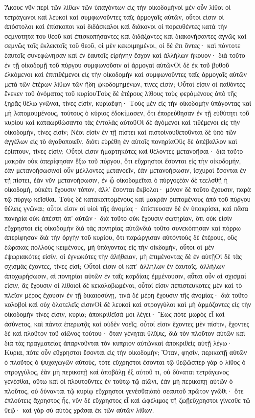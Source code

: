 Ἄκουε νῦν περὶ τῶν λίθων τῶν ὑπαγόντων εἰς τὴν οἰκοδομήνοἱ μὲν οὖν λίθοι οἱ τετράγωνοι καὶ λευκοὶ καὶ συμφωνοῦντες ταῖς ἁρμογαῖς αὐτῶν, οὗτοι εἰσιν οἱ ἀπόστολοι καὶ ἐπίσκοποι καὶ διδάσκαλοι καὶ διάκονοι οἱ πορευθέντες κατὰ τὴν σεμνοτητα του θεοῦ καὶ ἐπισκοπήσαντες καὶ διδάξαντες καὶ διακονήσαντες ἁγνῶς καὶ σεμνῶς τοῖς ἐκλεκτοῖς τοῦ θεοῦ, οἱ μὲν κεκοιμημένοι, οἱ δὲ ἔτι ὄντες· καὶ πάντοτε ἑαυτοῖς συνεφώνησαν καὶ ἐν ἑαυτοῖς εἰρήνην ἔσχον καὶ ἀλλήλων ἤκουον· διὰ τοῦτο ἐν τῇ οἰκοδομῇ τοῦ πύργου συμφωνοῦσιν αἱ ἁρμογαὶ αὐτῶνΟἱ δὲ ἐκ τοῦ βυθοῦ ἐλκόμενοι καὶ ἐπιτιθέμενοι εἰς τὴν οἰκοδομὴν καὶ συμφωνοῦντες ταῖς ἁρμογαῖς αὐτῶν μετὰ τῶν ἑτέρων λίθων τῶν ἤδη ᾠκοδομημένων, τίνες εἰσίν; Οὗτοί εἰσιν οἱ παθόντες ἕνεκεν τοῦ ὀνόματος τοῦ κυρίουΤοὺς δὲ ἑτέρους λίθους τοὺς φερόμένους ἀπὸ τῆς ξηρᾶς θέλω γνῶναι, τίνες εἰσίν, κυρίαἔφη· Τοὺς μὲν εἰς τὴν οἰκοδομὴν ὑπάγοντας καὶ μὴ λατομουμένους, τούτους ὁ κύριος ἐδοκίμασεν, ὅτι ἐπορεύθησαν ἐν τῇ εὐθύτητι τοῦ κυρίου καὶ καταωρθώσαντο τὰς ἐντολὰς αὐτοῦΟἱ δὲ ἀγόμενοι καὶ τιθέμενοι εἰς τὴν οἰκοδομήν, τίνες εἰσίν; Νέοι εἰσὶν ἐν τῇ πίστει καὶ πιστοίνουθετοῦνται δὲ ὑπό τῶν ἀγγέλων εἰς τὸ ἀγαθοποιεῖν, διότι εὑρέθη ἐν αὐτοῖς πονηρίαΟὓς δὲ ἀπέβαλλον καὶ ἐρίπτουν, τίνες εἰσίν; Οὗτοί εἰσιν ἡμαρτηκότες καὶ θέλοντες μετανοῆσαι· διὰ τοῦτο μακρὰν οὐκ ἀπερίφησαν ἔξω τοῦ πύργου, ὅτι εὔχρηστοι ἔσονται εἰς τὴν οἰκοδομήν, ἐὰν μετανοήσωσινοἱ οὖν μέλλοντες μετανοεῖν, ἐὰν μετανοήσωσιν, ἰσχυροὶ ἔσονται ἐν τῇ πίστει, ἐὰν νῦν μετανοήσωσιν, ἐν ᾧ οἰκοδομεῖται ὁ πύργοςἐὰν δὲ τεελσθῇ ἡ οἰκοδομή, οὐκέτι ἔχουσιν τόπον, ἀλλ’ ἔσονται ἔκβολοι· μόνον δὲ τοῦτο ἔχουσιν, παρὰ τῷ πύργῳ κεῖσθαι.
Τοὺς δὲ κατακοπτομένους καὶ μακρὰν ῥιπτομένους ἀπὸ τοῦ πύργου θέλεις γνῶναι; οὗτοι εἰσιν οἱ υἱοὶ τῆς ἀνομίας· ἐπίστευσαν δὲ ἐν ὑποκρίσει, καὶ πᾶσα πονηρία οὐκ ἀπέστη ἀπ’ αὐτῶν· διὰ τοῦτο οὐκ ἔχουσιν σωτηρίαν, ὅτι οὐκ εἰσὶν εὔχρηστοι εἰς οἰκοδομὴν διὰ τὰς πονηρίας αὐτῶνδιὰ τοῦτο συνεκόπησαν καὶ πόρρω ἀπερίφησαν διὰ τὴν ὀργὴν τοῦ κυρίου, ὅτι παρώργισαν αὐτόντοὺς δὲ ἑτέρους, οὓς ἑώρακας πολλοὺς κειμένους, μὴ ὑπάγοντας εἰς τὴν οἰκδομήν, οὗτοι οἱ μὲν ἐψωριακότες εἰσίν, οἱ ἐγνωκότες τὴν ἀλήθειαν, μὴ ἐπιμένοντας δὲ ἐν αὐτῇΟἱ δὲ τὰς σχισμὰς ἔχοντες, τίνες εἰσί; Οὗτοί εἰσιν οἱ κατ’ ἀλλήλων ἐν ἐαυτοῖς, ἀλλήλων ἀποχωρήσωσιν, αἱ πονηρίαι αὐτῶν ἐν ταῖς καρδίαις ἐμμένουσιν, αὖται οὖν αἱ σχισμαί εἰσιν, ἃς ἔχουσιν οἱ λίθοιοἱ δὲ κεκολοβωμένοι, οὗτοί εἰσιν πεπιστευκοτες μὲν καὶ τὸ πλεῖον μέρος ἔχουσιν ἐν τῇ δικαιοσύνῃ, τινὰ δὲ μέρη ἔχουσιν τῆς ἀνομίας· διὰ τοῦτο κολοβοὶ καὶ οὐχ ὁλοτελεῖς εἰσινΟἱ δὲ λευκοὶ καὶ στρογγύλοι καὶ μὴ ἁρμόζοντες εἰς τὴν οἰκοδομήν τίνες εἰσιν, κυρία; ἀποκριθεῖσά μοι λέγει· Ἕως πότε μωρὸς εἶ καὶ ἀσύνετος, καὶ πάντα ἐπερωτᾷς καὶ οὐδὲν νοεῖς; οὗτοί εἰσιν ἔχοντες μὲν πίστιν, ἔχοντες δὲ καὶ πλοῦτον τοῦ αἰῶνος τούτου· ὅταν γένηται θλῖψις, διὰ τὸν πλοῦτον αὐτῶν καὶ διὰ τὰς πραγματείας ἀπαρνοῦνται τὸν κυπριον αὐτῶνκαὶ ἀποκριθεὶς αὐτῇ λέγω· Κυρια, πότε οὖν εὔχρηστοι ἔσονται εἰς τὴν οἰκοδομήν; Ὅταν, φησίν, περικοπῇ αὐτῶν ὁ πλοῦτος ὁ ψυχαγωγῶν αὐτούς, τότε εὔχρηστοι ἔσονται τῷ θεῷὥσπερ γὰρ ὁ λίθος ὁ στρογγύλος, ἐὰν μὴ περικοπῇ καὶ ἀποβάλῃ ἐξ αὐτοῦ τι, οὐ δύναται τετράγωνος γενέσθαι, οὕτω καὶ οἱ πλουτοῦντες ἐν τούτῳ τῷ αἰῶνι, ἐὰν μὴ περικοπῃ αὐτῶν ὁ πλοῦτος, οὐ δύνανται τῷ κυρίῳ εὔχρηστοι γενέσθαιἀπὸ σεαυτοῦ πρῶτον γνῶθι· ὅτε ἐπλούτεις ἄχρηστος ἦς, νῦν δὲ εὔχρηστος εἶ καὶ ὠφέλιμος τῇ ζωῇεὔχρηστοι γίνεσθε τῷ θεῷ· καὶ γὰρ σὺ αὐτὸς χρᾶσαι ἐκ τῶν αὐτῶν λίθων.
